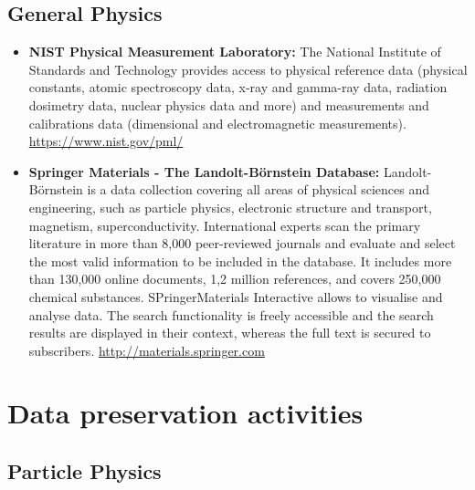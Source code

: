 \subsection{General Physics}\label{general-physics}

\begin{itemize}
\item
  \textbf{NIST Physical Measurement Laboratory:} The National Institute
  of Standards and Technology provides access to physical reference data
  (physical constants, atomic spectroscopy data, x-ray and gamma-ray
  data, radiation dosimetry data, nuclear physics data and more) and
  measurements and calibrations data (dimensional and electromagnetic
  measurements). \url{https://www.nist.gov/pml/}
\item
  \textbf{Springer Materials - The Landolt-Börnstein Database:}
  Landolt-Börnstein is a data collection covering all areas of physical
  sciences and engineering, such as particle physics, electronic
  structure and transport, magnetism, superconductivity. International
  experts scan the primary literature in more than 8,000 peer-reviewed
  journals and evaluate and select the most valid information to be
  included in the database. It includes more than 130,000 online
  documents, 1,2 million references, and covers 250,000 chemical
  substances. SPringerMaterials Interactive allows to visualise and
  analyse data. The search functionality is freely accessible and the
  search results are displayed in their context, whereas the full text
  is secured to subscribers. \url{http://materials.springer.com}
\end{itemize}

\section{Data preservation
activities}\label{data-preservation-activities}

\subsection{Particle Physics}\label{particle-physics-1}

